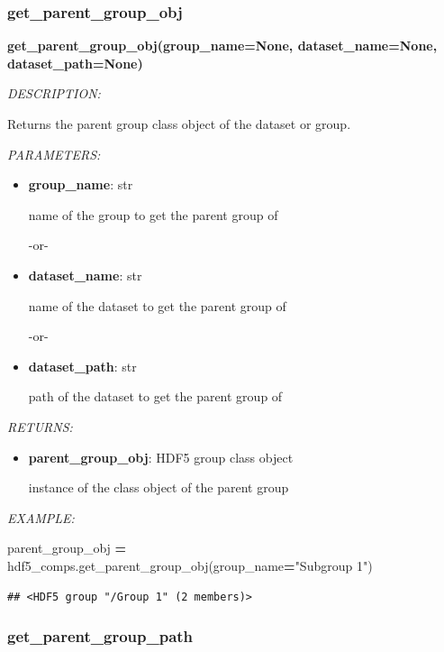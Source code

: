 \documentclass[
]{article}
\newenvironment{Shaded}{\begin{snugshade}}{\end{snugshade}}
\newcommand{\NormalTok}[1]{#1}
\newcommand{\OperatorTok}[1]{\textcolor[rgb]{0.81,0.36,0.00}{\textbf{#1}}}
\newcommand{\StringTok}[1]{\textcolor[rgb]{0.31,0.60,0.02}{#1}}
\begin{document}
\hypertarget{get_parent_group_obj}{%
\subsubsection{get\_parent\_group\_obj}\label{get_parent_group_obj}}

\textbf{get\_parent\_group\_obj(group\_name=None, dataset\_name=None, dataset\_path=None)}

\emph{DESCRIPTION:}

Returns the parent group class object of the dataset or group.

\emph{PARAMETERS:}

\begin{itemize}
\item
  \textbf{group\_name}: str

  name of the group to get the parent group of

  -or-
\item
  \textbf{dataset\_name}: str

  name of the dataset to get the parent group of

  -or-
\item
  \textbf{dataset\_path}: str

  path of the dataset to get the parent group of
\end{itemize}

\emph{RETURNS:}

\begin{itemize}
\item
  \textbf{parent\_group\_obj}: HDF5 group class object

  instance of the class object of the parent group
\end{itemize}

\emph{EXAMPLE:}

\begin{Shaded}
\begin{Highlighting}[]
\NormalTok{parent_group_obj }\OperatorTok{=}\NormalTok{ hdf5_comps.get_parent_group_obj(group_name}\OperatorTok{=}\StringTok{"Subgroup 1"}\NormalTok{)}
\end{Highlighting}
\end{Shaded}

\begin{verbatim}
## <HDF5 group "/Group 1" (2 members)>
\end{verbatim}

\hypertarget{get_parent_group_path}{%
\subsubsection{get\_parent\_group\_path}\label{get_parent_group_path}}
\end{document}
